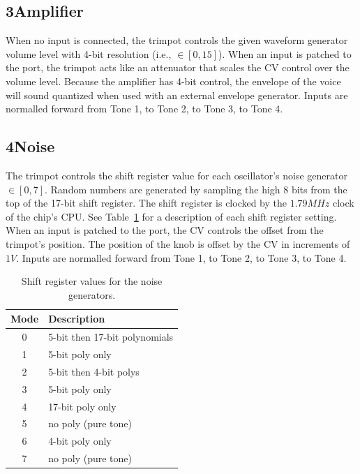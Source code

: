 \documentclass[12pt,letter]{article}
\begin{document}
\subsection*{3{\quad}Amplifier}

When no input is connected, the trimpot controls the given waveform generator volume level with 4-bit resolution (i.e., $\in [0, 15]$). When an input is patched to the port, the trimpot acts like an attenuator that scales the CV control over the volume level. Because the amplifier has 4-bit control, the envelope of the voice will sound quantized when used with an external envelope generator. Inputs are normalled forward from Tone 1, to Tone 2, to Tone 3, to Tone 4.

\subsection*{4{\quad}Noise}

The trimpot controls the shift register value for each oscillator's noise generator $\in [0, 7]$. Random numbers are generated by sampling the high 8 bits from the top of the 17-bit shift register. The shift register is clocked by the $1.79MHz$ clock of the chip's CPU. See Table~\ref{tab:shift-register} for a description of each shift register setting. When an input is patched to the port, the CV controls the offset from the trimpot's position. The position of the knob is offset by the CV in increments of $1V$. Inputs are normalled forward from Tone 1, to Tone 2, to Tone 3, to Tone 4.

\begin{table}[!htp]
\centering
\caption{Shift register values for the noise generators.}
\label{tab:shift-register}
\small
\begin{tabular}{|c||l|}
\hline
Mode & Description                   \\
\hline\hline
 0    & 5-bit then 17-bit polynomials \\
 1    & 5-bit poly only               \\
 2    & 5-bit then 4-bit polys        \\
 3    & 5-bit poly only               \\
 4    & 17-bit poly only              \\
 5    & no poly (pure tone)           \\
 6    & 4-bit poly only               \\
 7    & no poly (pure tone)           \\
\hline
\end{tabular}
\end{table}
\end{document}
